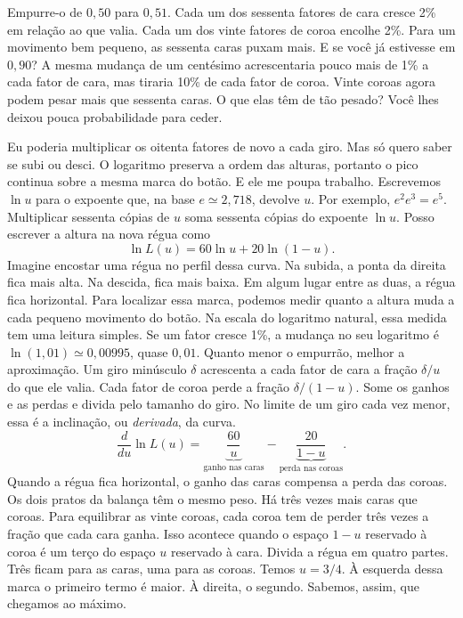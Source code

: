 Empurre-o de $0{,}50$ para $0{,}51$. Cada um dos sessenta fatores de cara cresce 2\% em relação ao que valia. Cada um dos vinte fatores de coroa encolhe 2\%. Para um movimento bem pequeno, as sessenta caras puxam mais. E se você já estivesse em $0{,}90$? A mesma mudança de um centésimo acrescentaria pouco mais de 1\% a cada fator de cara, mas tiraria 10\% de cada fator de coroa. Vinte coroas agora podem pesar mais que sessenta caras. O que elas têm de tão pesado? Você lhes deixou pouca probabilidade para ceder.

Eu poderia multiplicar os oitenta fatores de novo a cada giro. Mas só quero saber se subi ou desci. O logaritmo preserva a ordem das alturas, portanto o pico continua sobre a mesma marca do botão. E ele me poupa trabalho. Escrevemos $\ln u$ para o expoente que, na base $e\simeq2{,}718$, devolve $u$. Por exemplo, $e^2e^3=e^5$. Multiplicar sessenta cópias de $u$ soma sessenta cópias do expoente $\ln u$. Posso escrever a altura na nova régua como
\[
              \ln L(u)=60\ln u+20\ln(1-u).
\]
Imagine encostar uma régua no perfil dessa curva. Na subida, a ponta da direita fica mais alta. Na descida, fica mais baixa. Em algum lugar entre as duas, a régua fica horizontal. Para localizar essa marca, podemos medir quanto a altura muda a cada pequeno movimento do botão. Na escala do logaritmo natural, essa medida tem uma leitura simples. Se um fator cresce 1\%, a mudança no seu logaritmo é $\ln(1{,}01)\simeq0{,}00995$, quase $0{,}01$. Quanto menor o empurrão, melhor a aproximação. Um giro minúsculo $\delta$ acrescenta a cada fator de cara a fração $\delta/u$ do que ele valia. Cada fator de coroa perde a fração $\delta/(1-u)$. Some os ganhos e as perdas e divida pelo tamanho do giro. No limite de um giro cada vez menor, essa é a inclinação, ou \emph{derivada}, da curva.
\[
 \frac{d}{du}\ln L(u)
   =\underbrace{\frac{60}{u}}_{\text{ganho nas caras}}
    -\underbrace{\frac{20}{1-u}}_{\text{perda nas coroas}}.
\]
Quando a régua fica horizontal, o ganho das caras compensa a perda das coroas. Os dois pratos da balança têm o mesmo peso. Há três vezes mais caras que coroas. Para equilibrar as vinte coroas, cada coroa tem de perder três vezes a fração que cada cara ganha. Isso acontece quando o espaço $1-u$ reservado à coroa é um terço do espaço $u$ reservado à cara. Divida a régua em quatro partes. Três ficam para as caras, uma para as coroas. Temos $u=3/4$. À esquerda dessa marca o primeiro termo é maior. À direita, o segundo. Sabemos, assim, que chegamos ao máximo.


